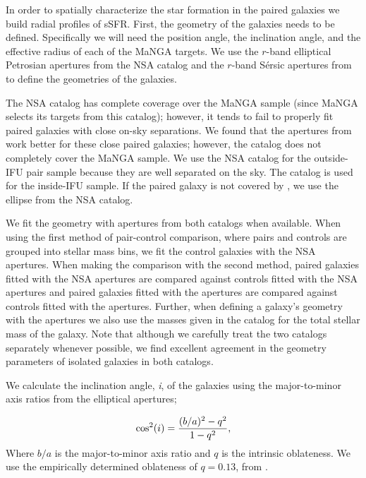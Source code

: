 \documentclass[iop,revtex4,twocolumn,apj,numberedappendix,appendixfloats]{emulateapj}
\begin{document}
In order to spatially characterize the star formation in the paired galaxies we build radial profiles of sSFR. First, the geometry of the galaxies needs to be defined. Specifically we will need the position angle, the inclination angle, and the effective radius of each of the MaNGA targets. We use the $r$-band elliptical Petrosian apertures from the NSA catalog and the $r$-band S\'ersic apertures from \citet{Simard:2011} to define the geometries of the galaxies. 

The NSA catalog has complete coverage over the MaNGA sample (since MaNGA selects its targets from this catalog); however, it tends to fail to properly fit paired galaxies with close on-sky separations. We found that the apertures from \citet{Simard:2011} work better for these close paired galaxies; however, the catalog does not completely cover the MaNGA sample. We use the NSA catalog for the outside-IFU pair sample because they are well separated on the sky. The \citet{Simard:2011} catalog is used for the inside-IFU sample. If the paired galaxy is not covered by \citet{Simard:2011}, we use the ellipse from the NSA catalog. 

We fit the geometry with apertures from both catalogs when available. When using the first method of pair-control comparison, where pairs and controls are grouped into stellar mass bins, we fit the control galaxies with the NSA apertures. When making the comparison with the second method, paired galaxies fitted with the NSA apertures are compared against controls fitted with the NSA apertures and paired galaxies fitted with the \citet{Simard:2011} apertures are compared against controls fitted with the \citet{Simard:2011} apertures. Further, when defining a galaxy's geometry with the \citet{Simard:2011} apertures we also use the masses given in the catalog for the total stellar mass of the galaxy. Note that although we carefully treat the two catalogs separately whenever possible, we find excellent agreement in the geometry parameters of isolated galaxies in both catalogs.

We calculate the inclination angle, {\it i}, of the galaxies using the major-to-minor axis ratios from the elliptical apertures;

\begin{equation}
{\rm cos^2}(i) = \frac{(b/a)^2 - q^2}{1 - q^2},
\end{equation}
Where $b/a$ is the major-to-minor axis ratio and $q$ is the intrinsic oblateness. We use the empirically determined oblateness of $q = 0.13$, from \citet{Giovanelli:1994}.
\end{document}
